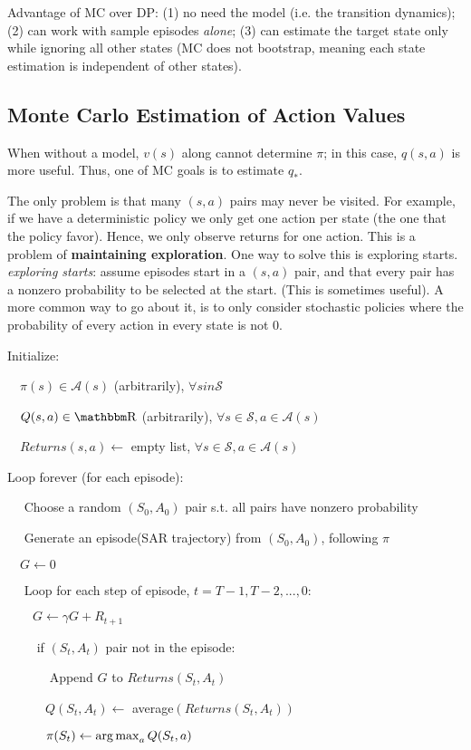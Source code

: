 \documentclass[sutton_barto_notes.tex]{subfiles}
\begin{document}
Advantage of MC over DP: (1) no need the model (i.e. the transition dynamics); (2) can work with sample episodes \textit{alone}; (3) can estimate the target state only while ignoring all other states (MC does not bootstrap, meaning each state estimation is independent of other states).

\subsection{Monte Carlo Estimation of Action Values}

When without a model, $v(s)$ along cannot determine $\pi$; in this case, $q(s,a)$ is more useful. Thus, one of MC goals is to estimate $q_*$.

The only problem is that many $(s,a)$ pairs may never be visited. For example, if we have a deterministic policy we only get one action per state (the one that the policy favor). Hence, we only observe returns for one action. This is a problem of \textbf{maintaining exploration}.
One way to solve this is exploring starts.
\textit{exploring starts}: assume episodes start in a $(s,a)$ pair, and that every pair has a nonzero probability to be selected at the start. (This is sometimes useful). A more common way to go about it, is to only consider stochastic policies where the probability of every action in every state is not 0.

\begin{tcolorbox}[width=1.1\textwidth,title={MC Exploring Starts, for estimating $V \approx v_\pi$}]
Initialize:

$\quad \pi(s) \in \mathcal{A}(s)$ (arbitrarily), $\forall s in \mathcal{S}$

$\quad Q(s,a) \in \R$ (arbitrarily), $\forall s \in \mathcal{S}, a \in \mathcal{A}(s)$

$\quad Returns(s,a) \leftarrow$ empty list, $\forall s \in \mathcal{S}, a \in \mathcal{A}(s)$

Loop forever (for each episode):

$\quad$ Choose a random $(S_0, A_0)$ pair s.t. all pairs have nonzero probability

$\quad$ Generate an episode(SAR trajectory) from $(S_0, A_0)$, following $\pi$

$\quad G \leftarrow 0$

$\quad$ Loop for each step of episode, $t = T-1, T-2, ..., 0$:

$\quad\quad G\leftarrow \gamma G + R_{t+1}$

$\quad\quad$ if $(S_t, A_t)$ pair not in the episode:

$\quad\quad\quad$ Append $G$ to $Returns(S_t, A_t)$

$\quad\quad\quad Q(S_t, A_t) \leftarrow$ average$(Returns(S_t, A_t))$

$\quad\quad\quad \pi(S_t) \leftarrow \operatorname*{arg\,max}_a Q(S_t, a)$

\end{tcolorbox}
\end{document}
